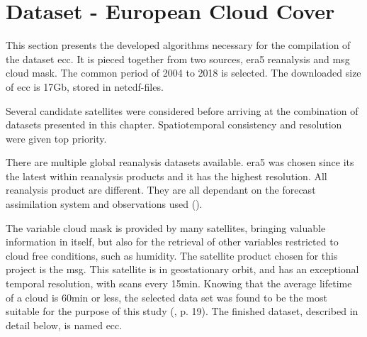 \section{Dataset - European Cloud Cover }
This section presents the developed algorithms necessary for the compilation of the dataset \acrfull{ecc}. It is pieced together from two sources, \acrshort{era5} reanalysis and \acrfull{msg} cloud mask. The common period of 2004 to 2018 is selected. The downloaded size of \acrshort{ecc} is 17Gb, stored in \acrshort{netcdf}-files.

Several candidate satellites were considered before arriving at the combination of datasets presented in this chapter. Spatiotemporal consistency and resolution were given top priority. %

There are multiple global reanalysis datasets available. \acrshort{era5} was chosen since its the latest within reanalysis products and it has the highest resolution. %
All reanalysis product are different. They are all dependant on the forecast assimilation system and observations used (\cite{Fujiwara2017IntroductionSystems}).

The variable cloud mask is provided by many satellites, bringing valuable information in itself, but also for the retrieval of other variables restricted to cloud free conditions, such as humidity. The satellite product chosen for this project is the \acrfull{msg}. This satellite is in geostationary orbit, and has an exceptional temporal resolution, with scans every 15min. Knowing that the average lifetime of a cloud is 60min or less, the selected data set was found to be the most suitable for the purpose of this study (\cite{lohmann2016}, p. 19). The finished dataset, described in detail below, is named \acrfull{ecc}. 

